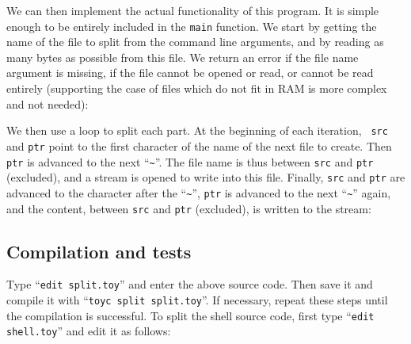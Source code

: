 We can then implement the actual functionality of this program. It is simple
enough to be entirely included in the {\tt main} function. We start by getting
the name of the file to split from the command line arguments, and by reading
as many bytes as possible from this file. We return an error if the file name
argument is missing, if the file cannot be opened or read, or cannot be read
entirely (supporting the case of files which do not fit in RAM is more complex
and not needed):


We then use a loop to split each part. At the beginning of each iteration, {\tt
src} and {\tt ptr} point to the first character of the name of the next file to
create. Then {\tt ptr} is advanced to the next ``\verb!~!''. The file name is
thus between {\tt src} and {\tt ptr} (excluded), and a stream is opened to
write into this file. Finally, {\tt src} and {\tt ptr} are advanced to the
character after the ``\verb!~!'', {\tt ptr} is advanced to the next
``\verb!~!'' again, and the content, between {\tt src} and {\tt ptr}
(excluded), is written to the stream:


\subsection{Compilation and tests}

Type ``{\tt edit split.toy}'' and enter the above source code. Then save it and
compile it with ``{\tt toyc split split.toy}''. If necessary, repeat these
steps until the compilation is successful. To split the shell source code,
first type ``{\tt edit shell.toy}'' and edit it as follows:

